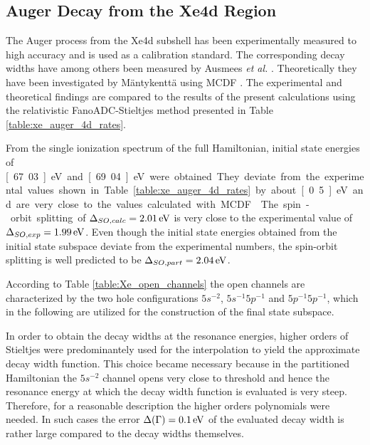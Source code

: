 \subsection{Auger Decay from the Xe4d Region}

The Auger process from the Xe4d subshell has been experimentally
measured to high accuracy \cite{Carroll02} and is used as a calibration standard.
The corresponding decay widths have among others been measured by Ausmees
\textit{et al.} \cite{Ausmees99,Aksela94}.
Theoretically they have been investigated by Mäntykenttä \cite{Maentykenttae93}
using \ac{MCDF} \cite{Fritzsche11}. 
The experimental and theoretical findings are compared to 
the results of the present calculations using the relativistic FanoADC-Stieltjes
method presented in Table \ref{table:xe_auger_4d_rates}.

From the single ionization spectrum of the full Hamiltonian, initial state
energies of \unit[67.03]{eV} and \unit[69.04]{eV} were obtained. They deviate
from the experimental values shown in Table \ref{table:xe_auger_4d_rates}
by about \unit[0.5]{eV} and are very close to the values calculated with
\ac{MCDF} \cite{Fritzsche11}. The spin-orbit splitting of
$\Delta_{SO,calc}=\unit[2.01]{eV}$ is very close to the experimental value
of $\Delta_{SO,exp}=\unit[1.99]{eV}$. Even though the initial state energies 
obtained from the initial state subspace
deviate from the experimental numbers, the spin-orbit
splitting is well predicted to be $\Delta_{SO,part}=\unit[2.04]{eV}$.

According to Table \ref{table:Xe_open_channels} the open channels are characterized
by the two hole configurations $5s^{-2}$, $5s^{-1}5p^{-1}$
and $5p^{-1}5p^{-1}$, which in the following are utilized for the construction
of the final state subspace.

In order to obtain the decay widths at the resonance energies,
higher orders of Stieltjes were predominantely
used for the interpolation to yield the approximate decay width function.
This choice became necessary because in the partitioned
Hamiltonian the $5s^{-2}$ channel
opens very close to threshold and hence the resonance energy at which the decay width
function is evaluated is very steep. Therefore, for a reasonable description
the higher orders polynomials were needed. In such cases the
error $\Delta(\Gamma)=\unit[0.1]{eV}$ of the evaluated
decay width is rather
large compared to the decay widths themselves.

